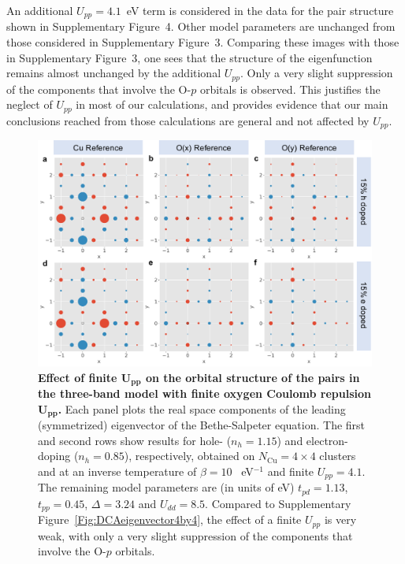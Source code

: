 \documentclass[11pt,superscriptaddress,floatfix,notitlepage]{revtex4-1}
\begin{document}
An additional $U_{pp} = 4.1$~eV term is considered in the data for the pair structure shown in Supplementary Figure~4. Other model parameters are unchanged from those considered in Supplementary Figure~3. Comparing these images with those in Supplementary Figure~3, one sees that the structure of the eigenfunction remains almost unchanged by the additional $U_{pp}$. Only a very slight suppression of the components that involve the O-$p$ orbitals is observed. This justifies the neglect of $U_{pp}$ in most of our calculations, and provides evidence that our main conclusions reached from those calculations are general and not affected by $U_{pp}$. 
\newline

\begin{figure}[h]
\centering
\includegraphics[width=\linewidth]{./Figures/DCAeigenvector4by4Upp41.pdf}
\caption{\textbf{Effect of finite $\mathbf{U_{pp}}$ on the orbital structure of the pairs in the three-band model with finite oxygen Coulomb repulsion $\mathbf{U_{pp}}$.} Each panel plots the real space components of the leading (symmetrized) eigenvector of the Bethe-Salpeter equation. The first and second rows show results for hole- ($n_h=1.15$) and electron-doping ($n_h=0.85$), respectively, obtained on $N_\text{Cu} = 4\times 4$ clusters and at an inverse temperature of $\beta=10$ ~eV$^{-1}$ and finite $U_{pp}=4.1$. The remaining model parameters are (in units of eV) $t_{pd}=1.13$, $t_{pp}=0.45$, $\Delta=3.24$ and $U_{dd}=8.5$. Compared to Supplementary Figure~\ref{Fig:DCAeigenvector4by4}, the effect of a finite $U_{pp}$ is very weak, with only a very slight suppression of the components that involve the O-$p$ orbitals. }
\label{Fig:DCAeigenvector4by4Upp41}
\end{figure}
\end{document}
